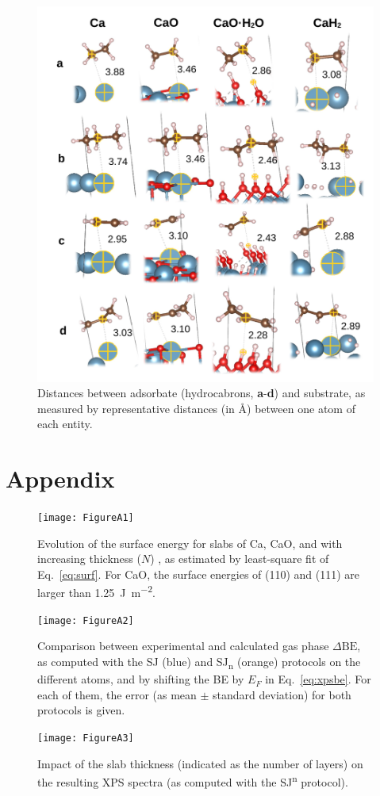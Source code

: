 \documentclass[12pt,a4paper]{article}
\def\dbe{\ensuremath{\Delta\text{BE}}}
\begin{document}
\begin{figure}[!h]
	\centering
	\includegraphics[width=.7\linewidth]{Figure6}
	\caption{Distances between adsorbate (hydrocabrons, \textbf{a}-\textbf{d}) and substrate, as measured by representative distances (in \si{\angstrom}) between one atom of each entity.}
	\label{fig:distsad}
\end{figure}


\clearpage



\clearpage
\appendix
{}
\section{Appendix}
\begin{figure}[!h]
	\texttt{[image: FigureA1]}
	\caption{Evolution of the surface energy for slabs of Ca, CaO, and  with increasing thickness ($N$) , as estimated by least-square fit of Eq.~\eqref{eq:surf}. For CaO, the surface energies of (110) and (111) are larger than \SI{1.25}{\joule\per\meter\squared}.}
	\label{fig:surf}
\end{figure}

\begin{figure}[!h]
	\centering
	\texttt{[image: FigureA2]}
	\caption{Comparison between experimental and calculated gas phase \dbe{}, as computed with the SJ (blue) and SJ\textsubscript{n} (orange) protocols on the different atoms, and by shifting the BE by $E_F$ in Eq.~\eqref{eq:xpsbe}. For each of them, the error (as mean $\pm$ standard deviation) for both protocols is given.}
	\label{fig:xps_C185_fermi}
\end{figure}


\begin{figure}[!h]
	\centering
	\texttt{[image: FigureA3]}
	\caption{Impact of the slab thickness (indicated as the number of layers) on the resulting XPS spectra (as computed with the SJ\textsuperscript{n} protocol).}
	\label{fig:slabsthicknessSJn}
\end{figure}



	
\end{document}
